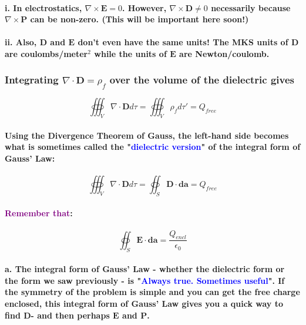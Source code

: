 \documentclass{article}
\begin{document}
\paragraph{\indent \indent i. In electrostatics, $\nabla\times \boldsymbol{E}=0$. However, $\nabla\times \boldsymbol{D}\neq 0$ necessarily because $\nabla\times \boldsymbol{P}$ can be non-zero. (This will be important here soon!)}
\paragraph{\indent \indent ii. Also, $\boldsymbol{D}$ and $\boldsymbol{E}$ don't even have the same units! The MKS units of $\boldsymbol{D}$ are coulombs/meter$^2$ while the units of $\boldsymbol{E}$ are Newton/coulomb.}
\subsubsection{Integrating $\nabla\cdot \boldsymbol{D}=\rho_f$ over the volume of the dielectric gives}
\begin{equation*}
    \oiiint_V\nabla\cdot\boldsymbol{D}d\tau=\oiiint_V\rho_f d\tau'=Q_{free}
\end{equation*}
\paragraph{Using the Divergence Theorem of Gauss, the left-hand side becomes what is sometimes called the "\textcolor{blue}{dielectric version}" of the integral form of Gauss' Law:}
\begin{equation*}
    \oiiint_V\nabla\cdot\boldsymbol{D}d\tau=\oiint_S\boldsymbol{D}\cdot\boldsymbol{da}=Q_{free}
\end{equation*}
\paragraph{\textcolor{purple}{Remember that}:}
\begin{equation*}
    \oiint_S\boldsymbol{E}\cdot\boldsymbol{da}=\frac{Q_{encl}}{\epsilon_0}
\end{equation*}
\paragraph{\indent a. The integral form of Gauss' Law - whether the dielectric form or the form we saw previously - is "\textcolor{blue}{Always true. Sometimes useful}". If the symmetry of the problem is simple and you can get the free charge enclosed, this integral form of Gauss' Law gives you a quick way to find $\boldsymbol{D}$- and then perhaps $\boldsymbol{E}$ and $\boldsymbol{P}$.}
\end{document}

